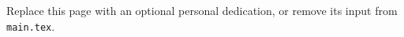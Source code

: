 \begin{dedication}
Replace this page with an optional personal dedication, or remove its input from \texttt{main.tex}.
\end{dedication}
